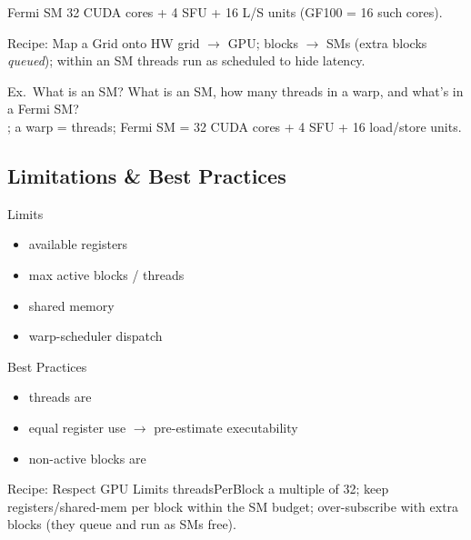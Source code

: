 \begin{definition}{Fermi SM}
    32 CUDA cores + 4 SFU + 16 L/S units (GF100 = 16 such cores).
\end{definition}

\multend

\begin{KR}{Recipe: Map a Grid onto HW}
    grid $\to$ GPU; blocks $\to$ SMs (extra blocks \emph{queued}); within an SM threads run as  scheduled to hide latency.
\end{KR}

\begin{example2}{Ex.\ What is an SM?}
    What is an SM, how many threads in a warp, and what's in a Fermi SM?
     \\ 
    ; a warp =  threads; Fermi SM = 32 CUDA cores + 4 SFU + 16 load/store units.
\end{example2}

\subsection{Limitations \& Best Practices}


\begin{concept}{Limits}
    \begin{itemize}
        \item available registers
        \item max active blocks / threads
        \item shared memory
        \item warp-scheduler dispatch
    \end{itemize}
\end{concept}

\begin{concept}{Best Practices}
    \begin{itemize}
        \item threads are 
        \item equal register use $\to$ pre-estimate executability
        \item non-active blocks are 
    \end{itemize}
\end{concept}

\multend

\begin{KR}{Recipe: Respect GPU Limits}
    threadsPerBlock a multiple of 32; keep registers/shared-mem per block within the SM budget; over-subscribe with extra blocks (they queue and run as SMs free).
\end{KR}

